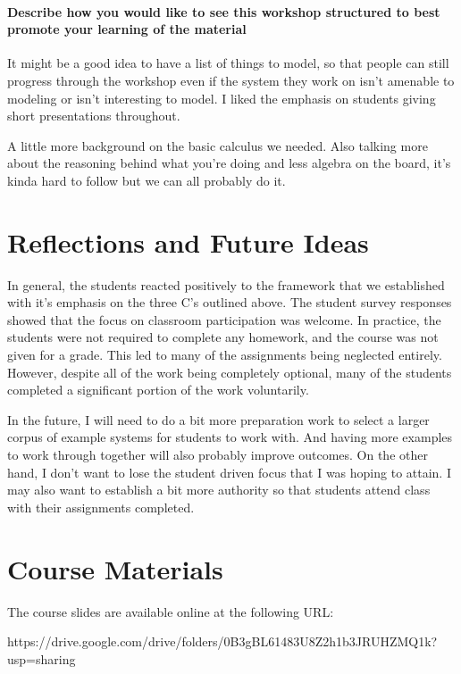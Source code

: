 \paragraph{ Describe how you would like to see this workshop structured to best promote your learning of the material }

It might be a good idea to have a list of things to model, so that people can still progress through the workshop even if the system they work on isn't amenable to modeling or isn't interesting to model. I liked the emphasis on students giving short presentations throughout. 

A little more background on the basic calculus we needed. Also talking more about the reasoning behind what you're doing and less algebra on the board, it's kinda hard to follow but we can all probably do it. 




\section{Reflections and Future Ideas}

In general, the students reacted positively to the framework that we established with it's emphasis on the three C's outlined above.  The student survey responses showed that the focus on classroom participation was welcome.  In practice, the students were not required to complete any homework, and the course was not given for a grade.  This led to many of the assignments being neglected entirely.  However, despite all of the work being completely optional, many of the students completed a significant portion of the work voluntarily.  

In the future, I will need to do a bit more preparation work to select a larger corpus of example systems for students to work with.  And having more examples to work through together will also probably improve outcomes. On the other hand, I don't want to lose the student driven focus that I was hoping to attain. I may also want to establish a bit more authority so that students attend class with their assignments completed.   


\section{Course Materials}

The course slides are available online at the following URL:

https://drive.google.com/drive/folders/0B3gBL61483U8Z2h1b3JRUHZMQ1k?usp=sharing

